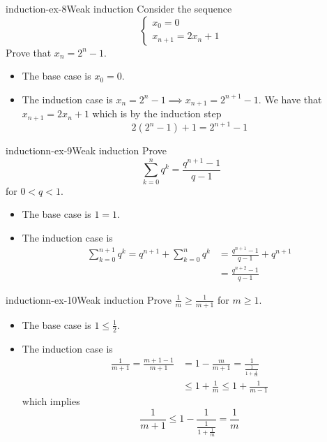 \documentclass[preview]{standalone}
\begin{document}
\begin{snippetexercise}{induction-ex-8}{Weak induction}
    Consider the sequence
    \[
        \begin{cases}
            x_0 = 0 \\
            x_{n+1} = 2x_n + 1
        \end{cases}        
    \]
    Prove that \(x_n = 2^n - 1\).
    \begin{itemize}
        \item The base case is \(x_0 = 0\).
        \item The induction case is \(x_{n} = 2^n - 1 \implies x_{n+1} = 2^{n+1}-1\).
        We have that \(x_{n+1} = 2x_n + 1\) which is by the induction step
        \[2(2^n - 1) + 1 = 2^{n+1} - 1\]
    \end{itemize}
\end{snippetexercise}

\begin{snippetexercise}{inductionn-ex-9}{Weak induction}
    Prove \[
        \sum_{k=0}^n q^k = \frac{q^{n+1} - 1}{q-1}
    \]
    for \(0<q<1\).
    \begin{itemize}
        \item The base case is \(1 = 1\).
        \item The induction case is
        \begin{align*}
            \sum_{k=0}^{n + 1} q^k = q^{n+1} + \sum_{k=0}^n q^k &= \frac{q^{n+1} - 1}{q-1} + q^{n+1} \\
            &= \frac{q^{n+2}-1}{q-1}
        \end{align*}
    \end{itemize}
\end{snippetexercise}

\begin{snippetexercise}{inductionn-ex-10}{Weak induction}
    Prove \(\frac{1}{m} \geq \frac{1}{m+1}\)
    for \(m \geq 1\).
    \begin{itemize}
        \item The base case is \(1 \leq \frac{1}{2}\).
        \item The induction case is
        \begin{align*}
            \frac{1}{m+1} = \frac{m+1-1}{m+1} &= 1- \frac{m}{m+1} = \frac{1}{\displaystyle \frac{1}{1 + \frac{1}{m}}} \\
            & \leq 1 + \frac{1}{m} \leq 1 + \frac{1}{m-1}
        \end{align*}
        which implies
        \[
            \frac{1}{m+1} \leq 1 - \frac{1}{\displaystyle \frac{1}{1 + \frac{1}{m}}} = \frac{1}{m}
        \]
    \end{itemize}
\end{snippetexercise}

\end{document}
